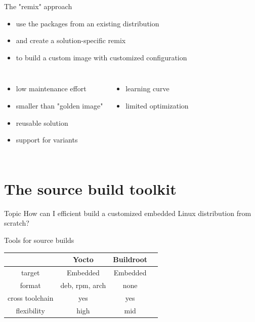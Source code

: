\documentclass{beamer}
\newcommand\pro{\item[$+$]}
\newcommand\con{\item[$-$]}
\begin{document}
\begin{frame}{The "remix" approach}
	\begin{itemize}
		\item use the packages from an existing distribution
		\item and create a solution-specific remix
		\item to build a custom image with customized configuration
	\end{itemize}

	\begin{columns}[t]
		\centering
		\begin{itemize}
			\pro low maintenance effort
			\pro smaller than "golden image"
			\pro reusable solution
			\pro support for variants
		\end{itemize}
		\centering
		\begin{itemize}
			\con learning curve
			\con limited optimization
		\end{itemize}
	\end{columns}
\end{frame}

\section{The source build toolkit}

\begin{frame}
	\begin{block}{Topic}
		How can I efficient build a customized embedded Linux distribution from scratch?
	\end{block}
\end{frame}

\begin{frame}{Tools for source builds}
	\begin{tabular}{c|ccc}
		& \textbf{Yocto} & \textbf{Buildroot}  \\
		\hline
		target & Embedded  & Embedded \\ 
		format & deb, rpm, arch & none \\
		cross toolchain & yes & yes \\
		flexibility & high & mid \\
	\end{tabular}
\end{frame}
\end{document}
